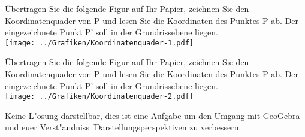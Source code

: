 \begin{Aufgabe}
Übertragen Sie die folgende Figur auf Ihr Papier, zeichnen Sie den Koordinatenquader von P und lesen
Sie die Koordinaten des Punktes P ab. Der eingezeichnete Punkt P’ soll in der Grundrissebene liegen.\\
\texttt{[image: ../Grafiken/Koordinatenquader-1.pdf]}

Übertragen Sie die folgende Figur auf Ihr Papier, zeichnen Sie den Koordinatenquader von P und lesen
Sie die Koordinaten des Punktes P ab. Der eingezeichnete Punkt P’ soll in der Grundrissebene liegen.\\
\texttt{[image: ../Grafiken/Koordinatenquader-2.pdf]}
\end{Aufgabe}
%
\begin{Loesung}
Keine L"osung darstellbar, dies ist eine Aufgabe um den Umgang mit GeoGebra und euer Verst"andniss f\ur Darstellungsperspektiven zu verbessern.
\end{Loesung}
%
